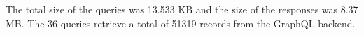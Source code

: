 \noindent The total size of the queries was 13.533 KB and the size of the responses was 8.37 MB. The 36 queries retrieve a total of 51319 records from the GraphQL backend.






